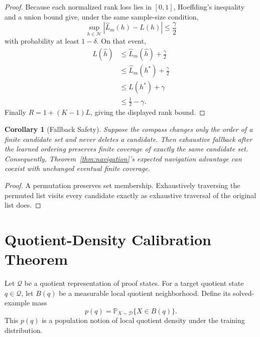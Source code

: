 \documentclass[11pt]{article}
\newtheorem{corollary}[theorem]{Corollary}
\newcommand{\Prob}{\mathbb{P}}
\newcommand{\Hcal}{\mathcal{H}}
\newcommand{\Dcal}{\mathcal{D}}
\newcommand{\Qcal}{\mathcal{Q}}
\begin{document}
\begin{proof}
Because each normalized rank loss lies in $[0,1]$, Hoeffding's inequality and a union bound give, under the same sample-size condition,
\[
\sup_{h\in\Hcal}|\widehat L_m(h)-L(h)|\le\frac\gamma2
\]
with probability at least $1-\delta$. On that event,
\begin{align*}
L(\widehat h)
&\le \widehat L_m(\widehat h)+\frac\gamma2\\
&\le \widehat L_m(h^*)+\frac\gamma2\\
&\le L(h^*)+\gamma\\
&\le \frac12-\gamma.
\end{align*}
Finally $R=1+(K-1)L$, giving the displayed rank bound.
\end{proof}

\begin{corollary}[Fallback Safety]
\label{cor:fallback}
Suppose the compass changes only the order of a finite candidate set and never deletes a candidate. Then exhaustive fallback after the learned ordering preserves finite coverage of exactly the same candidate set. Consequently, Theorem~\ref{thm:navigation}'s expected navigation advantage can coexist with unchanged eventual finite coverage.
\end{corollary}

\begin{proof}
A permutation preserves set membership. Exhaustively traversing the permuted list visits every candidate exactly as exhaustive traversal of the original list does.
\end{proof}

\section{Quotient-Density Calibration Theorem}

Let $\Qcal$ be a quotient representation of proof states. For a target quotient state $q\in\Qcal$, let $B(q)$ be a measurable local quotient neighborhood. Define its solved-example mass
\[
p(q)=\Prob_{X\sim\Dcal}\{X\in B(q)\}.
\]
This $p(q)$ is a population notion of local quotient density under the training distribution.
\end{document}
